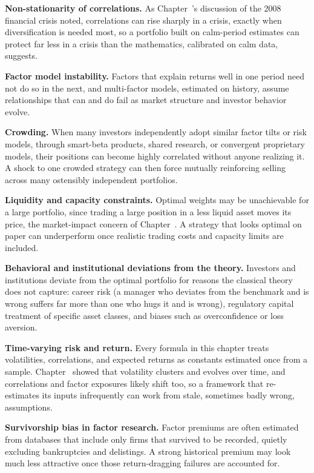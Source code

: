 \documentclass[../ai_in_finance]{subfiles}
\begin{document}
\textbf{Non-stationarity of correlations.} As Chapter~'s discussion of the 2008 financial crisis noted, correlations can rise sharply in a crisis, exactly when diversification is needed most, so a portfolio built on calm-period estimates can protect far less in a crisis than the mathematics, calibrated on calm data, suggests.

\textbf{Factor model instability.} Factors that explain returns well in one period need not do so in the next, and multi-factor models, estimated on history, assume relationships that can and do fail as market structure and investor behavior evolve.

\textbf{Crowding.} When many investors independently adopt similar factor tilts or risk models, through smart-beta products, shared research, or convergent proprietary models, their positions can become highly correlated without anyone realizing it. A shock to one crowded strategy can then force mutually reinforcing selling across many ostensibly independent portfolios.

\textbf{Liquidity and capacity constraints.} Optimal weights may be unachievable for a large portfolio, since trading a large position in a less liquid asset moves its price, the market-impact concern of Chapter~. A strategy that looks optimal on paper can underperform once realistic trading costs and capacity limits are included.

\textbf{Behavioral and institutional deviations from the theory.} Investors and institutions deviate from the optimal portfolio for reasons the classical theory does not capture: career risk (a manager who deviates from the benchmark and is wrong suffers far more than one who hugs it and is wrong), regulatory capital treatment of specific asset classes, and biases such as overconfidence or loss aversion.

\textbf{Time-varying risk and return.} Every formula in this chapter treats volatilities, correlations, and expected returns as constants estimated once from a sample. Chapter~ showed that volatility clusters and evolves over time, and correlations and factor exposures likely shift too, so a framework that re-estimates its inputs infrequently can work from stale, sometimes badly wrong, assumptions.

\textbf{Survivorship bias in factor research.} Factor premiums are often estimated from databases that include only firms that survived to be recorded, quietly excluding bankruptcies and delistings. A strong historical premium may look much less attractive once those return-dragging failures are accounted for.
\end{document}
